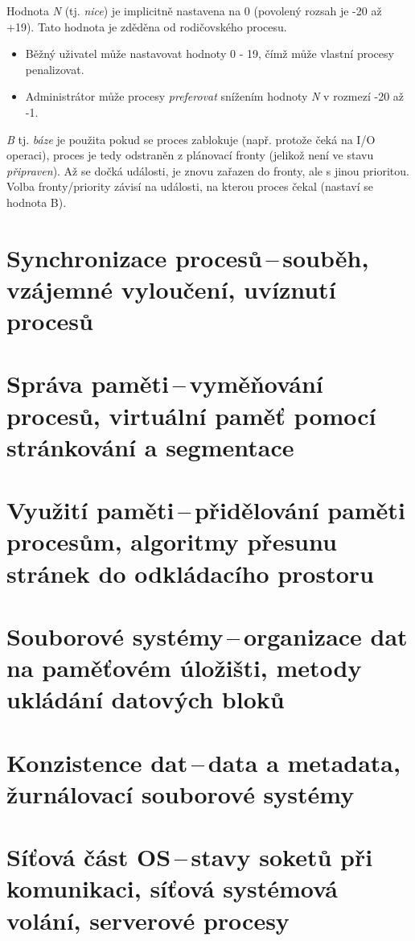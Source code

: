 \vspace{0,5cm}

Hodnota \textit{N} (tj. \textit{nice}) je implicitně nastavena na 0 (povolený rozsah je -20 až +19). Tato hodnota je zděděna od rodičovského procesu.

\begin{itemize}
    \item Běžný uživatel může nastavovat hodnoty 0 - 19, čímž může vlastní procesy penalizovat.
    \item Administrátor může procesy \textit{preferovat} snížením hodnoty \textit{N} v rozmezí -20 až -1.
\end{itemize}

\vspace{0,5cm}

\textit{B} tj. \textit{báze} je použita pokud se proces zablokuje (např. protože čeká na I/O operaci), proces je tedy odstraněn z plánovací fronty (jelikož není ve stavu \textit{připraven}). Až se dočká události, je znovu zařazen do fronty, ale s jinou prioritou. Volba fronty/priority závisí na události, na kterou proces čekal (nastaví se hodnota B).

\newpage
\section{Synchronizace procesů\,--\,souběh, vzájemné vyloučení, uvíznutí procesů} \label{sync}

\newpage
\section{Správa paměti\,--\,vyměňování procesů, virtuální paměť pomocí stránkování a segmentace}

\newpage
\section{Využití paměti\,--\,přidělování paměti procesům, algoritmy přesunu stránek do odkládacího prostoru}

\newpage
\section{Souborové systémy\,--\,organizace dat na paměťovém úložišti, metody ukládání datových bloků}

\newpage
\section{Konzistence dat\,--\,data a metadata, žurnálovací souborové systémy}

\newpage
\section{Síťová část OS\,--\,stavy soketů při komunikaci, síťová systémová volání, serverové procesy}